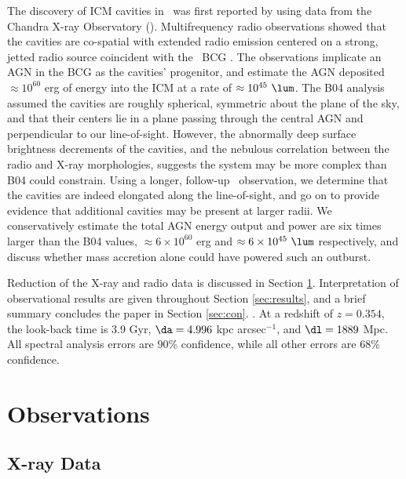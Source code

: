 \documentclass[11pt, preprint]{aastex}
\begin{document}
The discovery of ICM cavities in \rbs\ was first reported by
\citet{schindler01} using data from the Chandra X-ray Observatory
(\cxo). Multifrequency radio observations showed that the cavities are
co-spatial with extended radio emission centered on a strong, jetted
radio source coincident with the \rbs\ BCG \citep{2002astro.ph..1349D,
  gitti06, birzan08}. The observations implicate an AGN in the BCG as
the cavities' progenitor, and \citet[][hereafter B04]{birzan04}
estimate the AGN deposited $\approx 10^{60}$ erg of energy into the
ICM at a rate of $\approx 10^{45} ~\lum$. The B04 analysis assumed the
cavities are roughly spherical, symmetric about the plane of the sky,
and that their centers lie in a plane passing through the central AGN
and perpendicular to our line-of-sight. However, the abnormally deep
surface brightness decrements of the cavities, and the nebulous
correlation between the radio and X-ray morphologies, suggests the
system may be more complex than B04 could constrain. Using a longer,
follow-up \cxo\ observation, we determine that the cavities are indeed
elongated along the line-of-sight, and go on to provide evidence that
additional cavities may be present at larger radii. We conservatively
estimate the total AGN energy output and power are six times larger
than the B04 values, $\approx 6 \times 10^{60}$ erg and $\approx 6
\times 10^{45} ~\lum$ respectively, and discuss whether mass accretion
alone could have powered such an outburst.

Reduction of the X-ray and radio data is discussed in Section
\ref{sec:obs}. Interpretation of observational results are given
throughout Section \ref{sec:results}, and a brief summary concludes
the paper in Section \ref{sec:con}. \LCDM. At a redshift of $z =
0.354$, the look-back time is 3.9 Gyr, $\da = 4.996$ kpc
arcsec$^{-1}$, and $\dl = 1889$ Mpc. All spectral analysis errors are
90\% confidence, while all other errors are 68\% confidence.

\section{Observations}
\label{sec:obs}

\subsection{X-ray Data}
\label{sec:xray}
\end{document}
